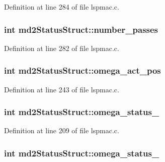 Definition at line 284 of file lspmac.\-c.

\hypertarget{structmd2StatusStruct_ab3da523bad7b82c1d27780caa24a8b92}{
\subsubsection[{number\-\_\-passes}]{\setlength{\rightskip}{0pt plus 5cm}int md2\-Status\-Struct\-::number\-\_\-passes}}\label{structmd2StatusStruct_ab3da523bad7b82c1d27780caa24a8b92}


Definition at line 282 of file lspmac.\-c.

\hypertarget{structmd2StatusStruct_a6ce303bec89082cae1e9b1fddf6b6c10}{
\subsubsection[{omega\-\_\-act\-\_\-pos}]{\setlength{\rightskip}{0pt plus 5cm}int md2\-Status\-Struct\-::omega\-\_\-act\-\_\-pos}}\label{structmd2StatusStruct_a6ce303bec89082cae1e9b1fddf6b6c10}


Definition at line 243 of file lspmac.\-c.

\hypertarget{structmd2StatusStruct_af6cf3cd65b9ef205685a0d970f168907}{
\subsubsection[{omega\-\_\-status\-\_\-1}]{\setlength{\rightskip}{0pt plus 5cm}int md2\-Status\-Struct\-::omega\-\_\-status\-\_}}\label{structmd2StatusStruct_af6cf3cd65b9ef205685a0d970f168907}


Definition at line 209 of file lspmac.\-c.

\hypertarget{structmd2StatusStruct_a8577c9df7b663b548b2759ac3db721cd}{
\subsubsection[{omega\-\_\-status\-\_\-2}]{\setlength{\rightskip}{0pt plus 5cm}int md2\-Status\-Struct\-::omega\-\_\-status\-\_}}\label{structmd2StatusStruct_a8577c9df7b663b548b2759ac3db721cd}


